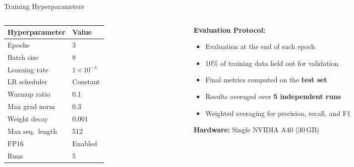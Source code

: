 \documentclass[aspectratio=169]{beamer}
\begin{document}
\begin{frame}{Training Hyperparameters}
  \begin{columns}[T]
    \begin{column}{0.48\textwidth}
      \begin{table}
        \small
        \begin{tabular}{ll}
          \toprule
          \textbf{Hyperparameter} & \textbf{Value} \\
          \midrule
          Epochs             & 3 \\
          Batch size         & 8 \\
          Learning rate      & $1 \times 10^{-4}$ \\
          LR scheduler       & Constant \\
          Warmup ratio       & 0.1 \\
          Max grad norm      & 0.3 \\
          Weight decay       & 0.001 \\
          Max seq.\ length   & 512 \\
          FP16               & Enabled \\
          Runs               & 5 \\
          \bottomrule
        \end{tabular}
      \end{table}
    \end{column}
    \begin{column}{0.48\textwidth}
      \textbf{Evaluation Protocol:}
      \begin{itemize}
        \item Evaluation at the end of each epoch
        \item 10\% of training data held out for validation
        \item Final metrics computed on the \textbf{test set}
        \item Results averaged over \textbf{5 independent runs}
        \item Weighted averaging for precision, recall, and F1
      \end{itemize}
      \vspace{0.3cm}
      \textbf{Hardware:} Single NVIDIA A40 (30\,GB)
    \end{column}
  \end{columns}
\end{frame}

\end{document}
